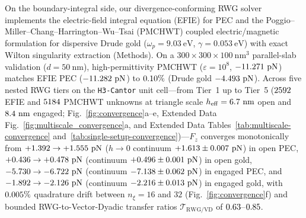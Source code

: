 \documentclass[pdflatex,sn-nature]{sn-jnl}
\begin{document}
On the boundary-integral side, our divergence-conforming RWG solver\cite{rao1982,reid2013pra} implements the electric-field integral equation (EFIE) for PEC and the Poggio--Miller--Chang--Harrington--Wu--Tsai (PMCHWT) coupled electric/magnetic formulation for dispersive Drude gold ($\omega_p = 9.03\ \mathrm{eV}$, $\gamma = 0.053\ \mathrm{eV}$) with exact Wilton singularity extraction (Methods). On a $300 \times 300 \times 100\ \mathrm{nm}^3$ parallel-slab validation ($d=50\ \mathrm{nm}$), high-permittivity PMCHWT ($\varepsilon = 10^8$, $-11.271{}\ \mathrm{pN}$) matches EFIE PEC ($-11.282{}\ \mathrm{pN}$) to $0.10{}\%$ (Drude gold $-4.493{}\ \mathrm{pN}$). Across five nested RWG tiers on the \texttt{H3-Cantor} unit cell---from Tier~1 up to Tier~5 ($2592{}$ EFIE and $5184{}$ PMCHWT unknowns at triangle scale $h_{\mathrm{eff}} = 6.7{}\ \mathrm{nm}$ open and $8.4{}\ \mathrm{nm}$ engaged; Fig.~\ref{fig:convergence}a--e, Extended Data Fig.~\ref{fig:multiscale_convergence}a, and Extended Data Tables~\ref{tab:multiscale-convergence} and~\ref{tab:single-setup-convergence})---$F_z$ converges monotonically from $+1.392{} \to +1.555{}\ \mathrm{pN}$ ($h\to 0$ continuum $+1.613{} \pm 0.007{}\ \mathrm{pN}$) in open PEC, $+0.436{} \to +0.478{}\ \mathrm{pN}$ (continuum $+0.496{} \pm 0.001{}\ \mathrm{pN}$) in open gold, $-5.730{} \to -6.722{}\ \mathrm{pN}$ (continuum $-7.138{} \pm 0.062{}\ \mathrm{pN}$) in engaged PEC, and $-1.892{} \to -2.126{}\ \mathrm{pN}$ (continuum $-2.216{} \pm 0.013{}\ \mathrm{pN}$) in engaged gold, with $0.005{}\%$ quadrature drift between $n_\xi=16$ and $32$ (Fig.~\ref{fig:convergence}f) and bounded RWG-to-Vector-Dyadic transfer ratios $\mathcal{T}_{\mathrm{RWG/VD}}$ of $0.63{}$--$0.85{}$.
\end{document}
